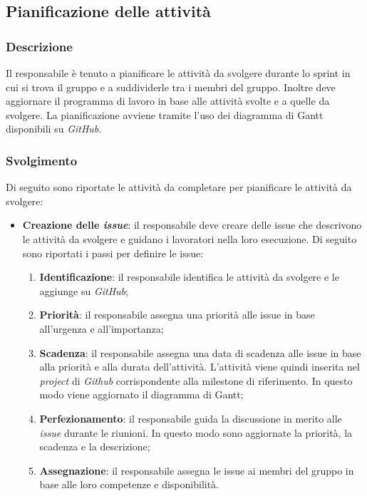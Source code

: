 \subsection{Pianificazione delle attività}
\label{pianificazione-attivia}

\subsubsection{Descrizione}
Il responsabile è tenuto a pianificare le attività da svolgere durante lo sprint
in cui si trova il gruppo e a suddividerle tra i membri del gruppo. Inoltre deve
aggiornare il programma di lavoro in base alle attività svolte e a quelle da
svolgere. La pianificazione avviene tramite l'uso dei diagramma di Gantt
disponibili su \textit{GitHub}.

\subsubsection{Svolgimento}
Di seguito sono riportate le attività da completare per pianificare le attività
da svolgere:

\begin{itemize}
	\item \textbf{Creazione delle \textit{issue}}: il responsabile deve creare
	      delle issue che descrivono le attività da svolgere e guidano i
	      lavoratori nella loro esecuzione. Di seguito sono riportati i passi
	      per definire le issue:
	      \begin{enumerate}
		      \item \textbf{Identificazione}: il responsabile identifica le
		            attività da svolgere e le aggiunge su \textit{GitHub};

		      \item \textbf{Priorità}: il responsabile assegna una priorità
		            alle issue in base all'urgenza e all'importanza;

		      \item \textbf{Scadenza}: il responsabile assegna una data di
		            scadenza alle issue in base alla priorità e alla durata
		            dell'attività. L'attività viene quindi inserita nel
		            \textit{project} di \textit{Github} corrispondente alla
		            milestone di riferimento. In questo modo viene aggiornato il
		            diagramma di Gantt;

		      \item \textbf{Perfezionamento}: il responsabile guida la
		            discussione in merito alle \textit{issue} durante le
		            riunioni. In questo modo sono aggiornate la priorità, la
		            scadenza e la descrizione;

		      \item \textbf{Assegnazione}: il responsabile assegna le issue
		            ai membri del gruppo in base alle loro competenze e
		            disponibilità.
	      \end{enumerate}
\end{itemize}
